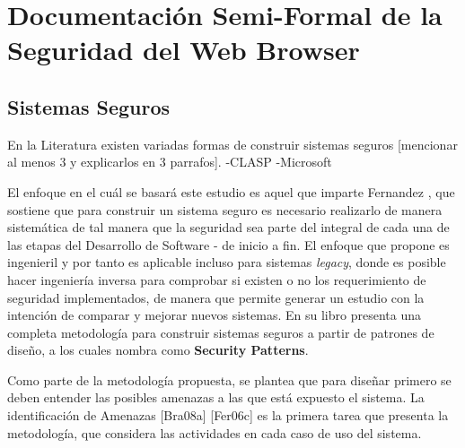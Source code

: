 \chapter{Documentación Semi-Formal de la Seguridad del Web Browser}
\label{chap:chap4}

\section{Sistemas Seguros}
\label{chap:chap4.1}
En la Literatura existen variadas formas de construir sistemas seguros 
[mencionar al menos 3 y explicarlos en 3 parrafos].
-CLASP
-Microsoft

El enfoque en el cuál se basará este estudio es aquel que imparte Fernandez \cite{fernandez2013security}, que sostiene que para construir un sistema seguro es necesario realizarlo de manera sistemática de tal manera que la seguridad sea parte del integral de cada una de las etapas del Desarrollo de Software - de inicio a fin. El enfoque que propone es ingenieril y por tanto es aplicable incluso para sistemas \textit{legacy}, donde es posible hacer ingeniería inversa para comprobar si existen o no los requerimiento de seguridad implementados, de manera que permite generar un estudio con la intención de comparar y mejorar nuevos sistemas. En su libro \cite{ref1} presenta una completa metodología para construir sistemas seguros a partir de patrones de diseño, a los cuales nombra como \textbf{Security Patterns}.

Como parte de la metodología propuesta, se plantea que para diseñar primero se deben entender las posibles amenazas a las que está expuesto el sistema. La identificación de Amenazas [Bra08a] [Fer06c] es la primera tarea que presenta la metodología, que considera las actividades en cada caso de uso del sistema.